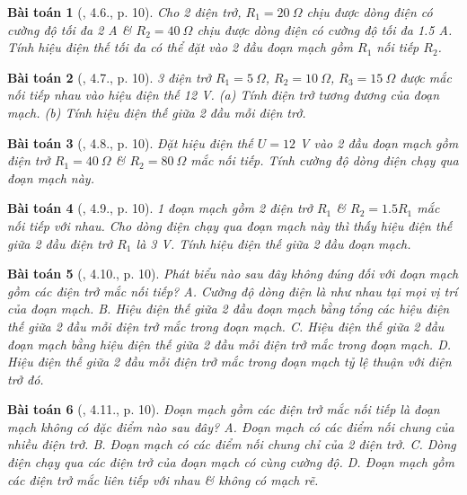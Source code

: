 \documentclass{article}
\newtheorem{baitoan}{Bài toán}
\begin{document}
\begin{baitoan}[\cite{SBT_Vat_Ly_9}, 4.6., p. 10]
	Cho 2 điện trở, $R_1 = 20\ \Omega$ chịu được dòng điện có cường độ tối đa \emph{2 A} \& $R_2 = 40\ \Omega$ chịu được dòng điện có cường độ tối đa \emph{1.5 A}. Tính hiệu điện thế tối đa có thể đặt vào 2 đầu đoạn mạch gồm $R_1$ nối tiếp $R_2$.
\end{baitoan}

\begin{baitoan}[\cite{SBT_Vat_Ly_9}, 4.7., p. 10]
	3 điện trở $R_1 = 5\ \Omega$, $R_2 = 10\ \Omega$, $R_3 = 15\ \Omega$ được mắc nối tiếp nhau vào hiệu điện thế \emph{12 V}. (a) Tính điện trở tương đương của đoạn mạch. (b) Tính hiệu điện thế giữa 2 đầu mỗi điện trở.
\end{baitoan}

\begin{baitoan}[\cite{SBT_Vat_Ly_9}, 4.8., p. 10]
	Đặt hiệu điện thế $U = 12$ \emph{V} vào 2 đầu đoạn mạch gồm điện trở $R_1 = 40\ \Omega$ \& $R_2 = 80\ \Omega$ mắc nối tiếp. Tính cường độ dòng điện chạy qua đoạn mạch này.
\end{baitoan}

\begin{baitoan}[\cite{SBT_Vat_Ly_9}, 4.9., p. 10]
	1 đoạn mạch gồm 2 điện trở $R_1$ \& $R_2 = 1.5R_1$ mắc nối tiếp với nhau. Cho dòng điện chạy qua đoạn mạch này thì thấy hiệu điện thế giữa 2 đầu điện trở $R_1$ là \emph{3 V}. Tính hiệu điện thế giữa 2 đầu đoạn mạch.
\end{baitoan}

\begin{baitoan}[\cite{SBT_Vat_Ly_9}, 4.10., p. 10]
	Phát biểu nào sau đây không đúng đối với đoạn mạch gồm các điện trở mắc nối tiếp? {\sf A.} Cường độ dòng điện là như nhau tại mọi vị trí của đoạn mạch. {\sf B.} Hiệu điện thế giữa 2 đầu đoạn mạch bằng tổng các hiệu điện thế giữa 2 đầu mỗi điện trở mắc trong đoạn mạch. {\sf C.} Hiệu điện thế giữa 2 đầu đoạn mạch bằng hiệu điện thế giữa 2 đầu mỗi điện trở mắc trong đoạn mạch. {\sf D.} Hiệu điện thế giữa 2 đầu mỗi điện trở mắc trong đoạn mạch tỷ lệ thuận với điện trở đó.
\end{baitoan}

\begin{baitoan}[\cite{SBT_Vat_Ly_9}, 4.11., p. 10]
	Đoạn mạch gồm các điện trở mắc nối tiếp là đoạn mạch không có đặc điểm nào sau đây? {\sf A.} Đoạn mạch có các điểm nối chung của nhiều điện trở. {\sf B.} Đoạn mạch có các điểm nối chung chỉ của 2 điện trở. {\sf C.} Dòng điện chạy qua các điện trở của đoạn mạch có cùng cường độ. {\sf D.} Đoạn mạch gồm các điện trở mắc liên tiếp với nhau \& không có mạch rẽ.
\end{baitoan}
\end{document}
